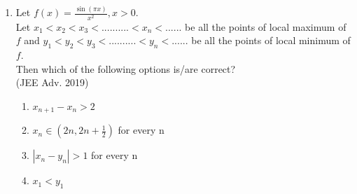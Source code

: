 \documentclass[journal,12pt,twocolumn]{IEEEtran}
\theoremstyle{remark}
\begin{document}
\begin{enumerate}
{        }
        \newpage
    \item{
        
            Let $f(x) = \frac{\sin(\pi x)}{x^2}, x>0$.\\[3pt]
            Let $x_1 < x_2 < x_3 < .......... <x_n <......$ be all the points of local maximum of $f$ and $y_1 < y_2 < y_3 < .......... <y_n <......$ be all the points of local minimum of $f$.\\
            Then which of the following options is/are correct?
            \\ \text{   } \hfill
                {(JEE Adv. 2019)}
            
            \begin{enumerate}
                \item $x_{n+1} - x_{n} > 2$ 
                \item $x_{n} \in (2n, 2n+\frac{1}{2})$ for every n
                \item $|x_{n} - y_{n}|> 1 $ for every n
                \item $x_{1} < y_{1}$
            \end{enumerate}
        
        }
    \end{enumerate}
\end{document}
